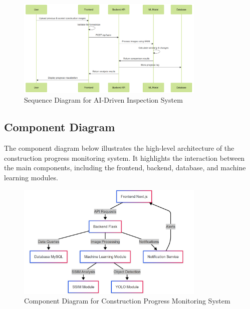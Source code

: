 \documentclass[12pt,a4paper]{report}
\begin{document}
\begin{figure}[H]
    \centering
    \includegraphics[width=0.8\textwidth]{images/sequence diagram.PNG}
    \caption{Sequence Diagram for AI-Driven Inspection System}
    \label{fig:sequence-diagram}
\end{figure}

\subsection{Component Diagram}
The component diagram below illustrates the high-level architecture of the construction progress monitoring system. It highlights the interaction between the main components, including the frontend, backend, database, and machine learning modules.

\begin{figure}[H]
    \centering
    \includegraphics[width=0.8\textwidth]{images/component diagram.PNG}
    \caption{Component Diagram for Construction Progress Monitoring System}
    \label{fig:component-diagram}
\end{figure}
\end{document}
